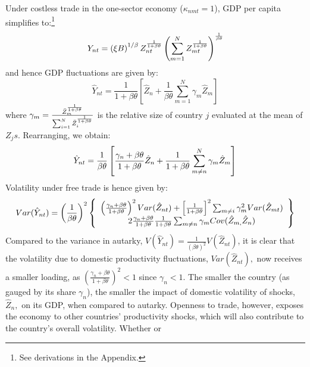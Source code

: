 \documentclass{article}
\begin{document}
Under costless trade in the one-sector economy ($\kappa _{nmt}=1$), GDP per
capita simplifies to:\footnote{%
See derivations in the Appendix.} 
\begin{equation*}
Y_{nt}=\left( \xi B\right) ^{1/\beta }Z_{nt}^{\frac{1}{1+\beta \theta }%
}\left( \sum_{m=1}^{N}Z_{mt}^{\frac{1}{1+\beta \theta }}\right) ^{\frac{1}{%
\beta \theta }} 
\end{equation*}%
and hence GDP fluctuations are given by: 
\begin{equation*}
\hat{Y}_{nt}=\frac{1}{1+\beta \theta }\left[ \hat{Z}_{n}+\frac{1}{\beta
\theta }\sum_{m=1}^{N}\gamma _{m}\hat{Z}_{m}\right] 
\end{equation*}%
where $\gamma _{m}=\frac{\bar{Z}_{m}^{\frac{1}{1+\beta \theta }}}{%
\sum_{i=1}^{N}\bar{Z}_{i}^{\frac{1}{1+\beta \theta }}}$ is the relative size
of country $j$ evaluated at the mean of $Z_{j}s$. Rearranging, we obtain: 
\begin{equation}
\hat{Y}_{nt}=\frac{1}{\beta \theta }\left[ \frac{\gamma _{n}+\beta \theta }{%
1+\beta \theta }\hat{Z}_{n}+\frac{1}{1+\beta \theta }\sum_{m\neq
n}^{N}\gamma _{m}\hat{Z}_{m}\right]
\end{equation}%
Volatility under free trade is hence given by: 
\begin{equation}
Var(\hat{Y}_{nt})=\left( \frac{1}{\beta \theta }\right) ^{2}\left\{ 
\begin{array}{c}
\left( \frac{\gamma _{n}+\beta \theta }{1+\beta \theta }\right) ^{2}Var(\hat{%
Z}_{nt})+\left[ \frac{1}{1+\beta \theta }\right] ^{2}\sum_{m\neq i}\gamma
_{m}^{2}Var(\hat{Z}_{mt}) \\ 
2\frac{\gamma _{n}+\beta \theta }{1+\beta \theta }\frac{1}{1+\beta \theta }%
\sum_{m\neq n}\gamma _{m}Cov(\hat{Z}_{m,}\hat{Z}_{n})%
\end{array}%
\right\}
\end{equation}%
Compared to the variance in autarky, $V(\hat{Y}_{nt})=\frac{1}{\left( \beta
\theta \right) ^{2}}V(\hat{Z}_{nt})$, it is clear that the volatility due to
domestic productivity fluctuations, $Var(\hat{Z}_{nt}),$ now receives a
smaller loading, as $\left( \frac{\gamma _{n}+\beta \theta }{1+\beta \theta }%
\right) ^{2}<1$ since $\gamma _{n}<1.$ The smaller the country (as gauged by
its share $\gamma _{n}$), the smaller the impact of domestic volatility of
shocks, $\hat{Z}_{n},$ on its GDP, when compared to autarky. Openness to
trade, however, exposes the economy to other countries' productivity shocks,
which will also contribute to the country's overall volatility. Whether or
\end{document}

